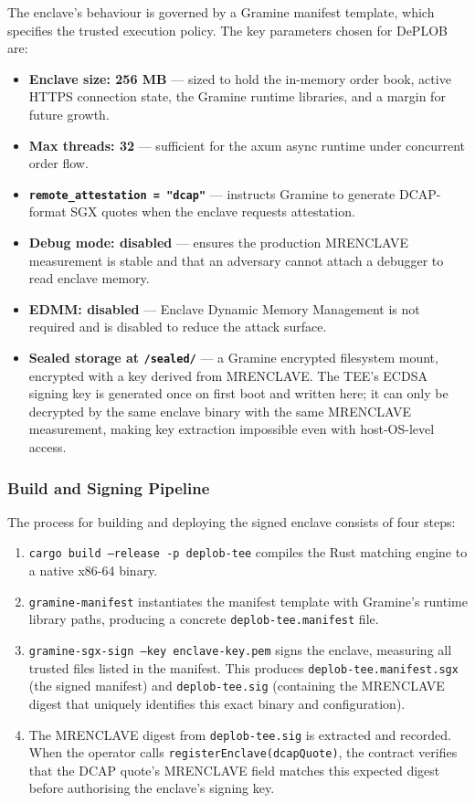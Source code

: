 \documentclass[12pt,a4paper]{article}
\begin{document}
The enclave's behaviour is governed by a Gramine manifest template, which specifies the trusted execution policy. The key parameters chosen for DePLOB are:

\begin{itemize}
    \item \textbf{Enclave size: 256 MB} — sized to hold the in-memory order book, active HTTPS connection state, the Gramine runtime libraries, and a margin for future growth.
    \item \textbf{Max threads: 32} — sufficient for the axum async runtime under concurrent order flow.
    \item \textbf{\texttt{remote\_attestation = "dcap"}} — instructs Gramine to generate DCAP-format SGX quotes when the enclave requests attestation.
    \item \textbf{Debug mode: disabled} — ensures the production MRENCLAVE measurement is stable and that an adversary cannot attach a debugger to read enclave memory.
    \item \textbf{EDMM: disabled} — Enclave Dynamic Memory Management is not required and is disabled to reduce the attack surface.
    \item \textbf{Sealed storage at \texttt{/sealed/}} — a Gramine encrypted filesystem mount, encrypted with a key derived from MRENCLAVE. The TEE's ECDSA signing key is generated once on first boot and written here; it can only be decrypted by the same enclave binary with the same MRENCLAVE measurement, making key extraction impossible even with host-OS-level access.
\end{itemize}

\subsubsection{Build and Signing Pipeline}

The process for building and deploying the signed enclave consists of four steps:

\begin{enumerate}
    \item \texttt{cargo build --release -p deplob-tee} compiles the Rust matching engine to a native x86-64 binary.
    \item \texttt{gramine-manifest} instantiates the manifest template with Gramine's runtime library paths, producing a concrete \texttt{deplob-tee.manifest} file.
    \item \texttt{gramine-sgx-sign --key enclave-key.pem} signs the enclave, measuring all trusted files listed in the manifest. This produces \texttt{deplob-tee.manifest.sgx} (the signed manifest) and \texttt{deplob-tee.sig} (containing the MRENCLAVE digest that uniquely identifies this exact binary and configuration).
    \item The MRENCLAVE digest from \texttt{deplob-tee.sig} is extracted and recorded. When the operator calls \texttt{registerEnclave(dcapQuote)}, the contract verifies that the DCAP quote's MRENCLAVE field matches this expected digest before authorising the enclave's signing key.
\end{enumerate}
\end{document}
